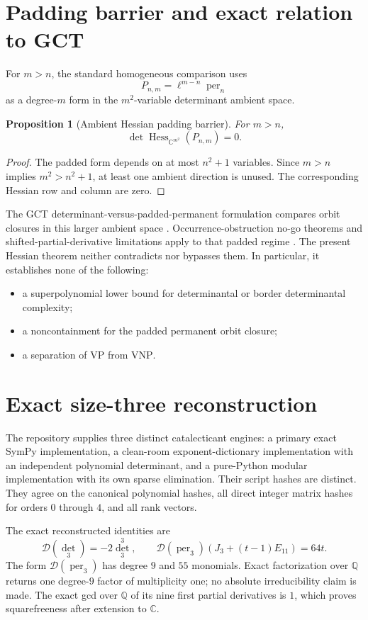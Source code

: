 \documentclass[11pt]{article}
\newtheorem{proposition}[theorem]{Proposition}
\theoremstyle{remark}
\DeclareMathOperator{\Hess}{Hess}
\DeclareMathOperator{\per}{per}
\newcommand{\C}{\mathbb C}
\newcommand{\Q}{\mathbb Q}
\newcommand{\Dcal}{\mathcal D}
\begin{document}
\section{Padding barrier and exact relation to GCT}\label{sec:padding}
For $m>n$, the standard homogeneous comparison uses
\[
 P_{n,m}=\ell^{m-n}\per_n
\]
as a degree-$m$ form in the $m^2$-variable determinant ambient space.

\begin{proposition}[Ambient Hessian padding barrier]\label{prop:padding}
For $m>n$,
\[
 \det\Hess_{\C^{m^2}}(P_{n,m})=0.
\]
\end{proposition}
\begin{proof}
The padded form depends on at most $n^2+1$ variables.  Since $m>n$ implies $m^2>n^2+1$, at least one ambient direction is unused.  The corresponding Hessian row and column are zero.
\end{proof}

The GCT determinant-versus-padded-permanent formulation compares orbit closures in this larger ambient space \cite{MS1,MS2,BI}.  Occurrence-obstruction no-go theorems and shifted-partial-derivative limitations apply to that padded regime \cite{BIP,ELSW}.  The present Hessian theorem neither contradicts nor bypasses them.  In particular, it establishes none of the following:
\begin{itemize}[leftmargin=2em]
\item a superpolynomial lower bound for determinantal or border determinantal complexity;
\item a noncontainment for the padded permanent orbit closure;
\item a separation of $\mathrm{VP}$ from $\mathrm{VNP}$.
\end{itemize}

\section{Exact size-three reconstruction}
The repository supplies three distinct catalecticant engines: a primary exact SymPy implementation, a clean-room exponent-dictionary implementation with an independent polynomial determinant, and a pure-Python modular implementation with its own sparse elimination.  Their script hashes are distinct.  They agree on the canonical polynomial hashes, all direct integer matrix hashes for orders $0$ through $4$, and all rank vectors.

The exact reconstructed identities are
\[
 \Dcal(\det_3)=-2\det_3^3,
 \qquad
 \Dcal(\per_3)(J_3+(t-1)E_{11})=64t.
\]
The form $\Dcal(\per_3)$ has degree $9$ and $55$ monomials.  Exact factorization over $\Q$ returns one degree-$9$ factor of multiplicity one; no absolute irreducibility claim is made.  The exact gcd over $\Q$ of its nine first partial derivatives is $1$, which proves squarefreeness after extension to $\C$.
\end{document}
